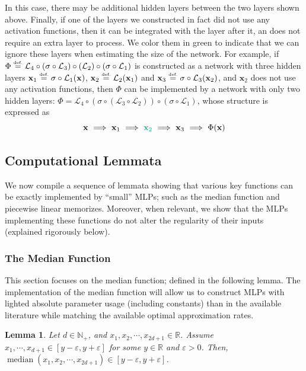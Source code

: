 \documentclass{article}
\numberwithin{equation}{section}
\newtheorem{lemma}{Lemma}[section]
\theoremstyle{definition}
\newcommand{\eqdef}{\ensuremath{\stackrel{\mbox{\upshape\tiny def.}}{=}}}
\begin{document}
In this case, there may be additional hidden layers between the two layers shown above. Finally, if one of the layers we constructed in fact did not use any activation functions, then it can be integrated with the layer after it, an does not require an extra layer to process. We color them in green to indicate that we can ignore these layers when estimating the size of the network. For example, if $\Phi \eqdef \mathcal{L}_4 \circ (\sigma \circ \mathcal{L}_3) \circ (\mathcal{L}_2) \circ (\sigma \circ \mathcal{L}_1)$ is constructed as a network with three hidden layers $\mathbf{x}_1 \eqdef \sigma \circ \mathcal{L}_1 (\mathbf{x})$, $\mathbf{x}_2 \eqdef \mathcal{L}_2 (\mathbf{x}_1)$ and $\mathbf{x}_3 \eqdef \sigma \circ \mathcal{L}_3 (\mathbf{x}_2)$, and $\mathbf{x}_2$ does not use any activation functions, then $\Phi$ can be implemented by a network with only two hidden layers: $\Phi = \mathcal{L}_4 \circ (\sigma \circ (\mathcal{L}_3 \circ \mathcal{L}_2)) \circ (\sigma \circ \mathcal{L}_1)$, whose structure is expressed as 
\[
    \mathbf{x}
    \ \Longrightarrow \
    \mathbf{x}_1
    \ \Longrightarrow \
    {\color{persiangreen} \mathbf{x}_2 }
    \ \Longrightarrow \
    \mathbf{x}_3
    \ \Longrightarrow \
    \Phi(\mathbf{x})
\]






\subsection{Computational Lemmata}
\label{s:Compute}

We now compile a sequence of lemmata showing that various key functions can be exactly implemented by ``small'' MLPs; such as the median function and piecewise linear memorizes.  Moreover, when relevant, we show that the MLPs implementing these functions do not alter the regularity of their inputs (explained rigorously below).

\subsubsection{The Median Function}
\label{s:Compute__ss:Median}
This section focuses on the median function; defined in the following lemma.  The implementation of the median function will allow us to construct MLPs with lighted absolute parameter usage (including constants) than in the available literature while matching the available optimal approximation rates.
\begin{lemma}
\label{lem:median_estimators_have_small_errors}
    Let $d\in\mathbb{N}_+$, and $x_1,x_2,\cdots,x_{2d+1}\in\mathbb{R}$. Assume $x_1,\cdots,x_{d+1}\in [y-\varepsilon, y+\varepsilon]$ for some $y\in\mathbb{R}$ and $\varepsilon>0$. Then, $\operatorname{median}(x_1,x_2,\cdots,x_{2d+1})\in [y-\varepsilon, y+\varepsilon]$. 
\end{lemma}
\end{document}
